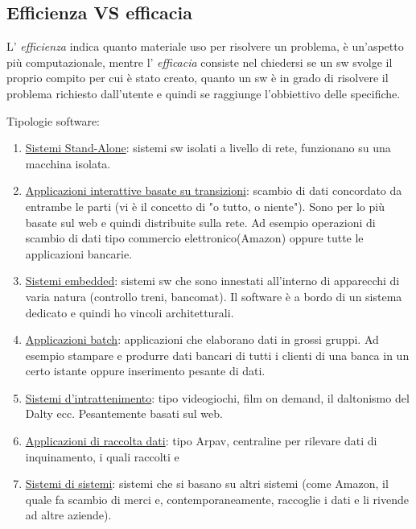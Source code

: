 \documentclass[a4paper, 10pt]{article}
\begin{document}
	\subsection*{Efficienza VS efficacia}
	L' \textit{efficienza} indica quanto materiale uso per risolvere un problema, è un'aspetto più computazionale, mentre l' \textit{efficacia} consiste nel chiedersi se un sw svolge il proprio compito per cui è stato creato, quanto un sw è in grado di risolvere il problema richiesto dall'utente e quindi se raggiunge l'obbiettivo delle specifiche.
	
	\noindent
	Tipologie software:
	\begin{enumerate}
		\item \underline{Sistemi Stand-Alone}: sistemi sw isolati a livello di rete, funzionano su una macchina isolata.
		\item \underline{Applicazioni interattive basate su transizioni}: scambio di dati concordato
		da entrambe le parti (vi è il concetto di "o tutto, o niente"). Sono per lo
		più basate sul web e quindi distribuite sulla rete. Ad esempio operazioni di scambio di dati tipo commercio elettronico(Amazon) oppure tutte le applicazioni bancarie.
		\item \underline{Sistemi embedded}: sistemi sw che sono innestati all'interno di apparecchi di varia natura (controllo treni, bancomat). Il software è a bordo di un sistema dedicato e quindi ho vincoli architetturali. 
		\item \underline{Applicazioni batch}: applicazioni che elaborano dati in grossi gruppi. Ad esempio stampare e produrre dati bancari di tutti i clienti di una banca in un certo istante oppure inserimento pesante di dati.
		\item \underline{Sistemi d'intrattenimento}: tipo videogiochi, film on demand, il daltonismo del Dalty ecc. Pesantemente basati sul web.
		\item \underline{Applicazioni di raccolta dati}: tipo Arpav, centraline per rilevare dati di inquinamento, i quali raccolti e 
		\item \underline{Sistemi di sistemi}: sistemi che si basano su altri sistemi (come Amazon,
		il quale fa scambio di merci e, contemporaneamente, raccoglie i dati e li
		rivende ad altre aziende).
	\end{enumerate}
	
\end{document}
